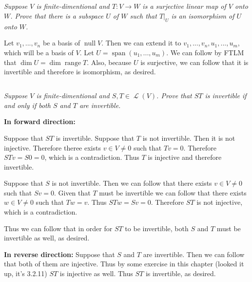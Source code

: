 \documentclass[11pt,oneside,titlepage]{book}
\DeclareMathOperator \map {\mathcal {L}}
\DeclareMathOperator \ns {null}
\DeclareMathOperator \range {range}
\DeclareMathOperator \Span {span}
\begin{document}
\subsection{}

\textit{Suppose $V$ is finite-dimentional and $T: V \to W$ is a surjective linear map
  of $V$ onto $W$. Prove that there is a subspace $U$ of $W$ such that
  $T|_U$ is an isomorphism of $U$ onto $W$. }

Let $v_1, ..., v_n$ be a basis of $\ns V$. Then we can extend it to  $v_1, ..., v_n, u_1, ..., u_m$,
which will be a basis of $V$. Let $U = \Span(u_1, ..., u_m)$. We can follow by FTLM that
$\dim U = \dim \range T$. Also, because $U$ is surjective, we can follow that it is invertible
and therefore is isomorphism, as desired.

\subsection{}

\textit{Suppose $V$ is finite-dimentional and $S, T \in \map(V)$. Prove that $ST$ is invertible
  if and only if both $S$ and $T$ are invertible.}

\textbf{In forward direction: }

Suppose that $ST$ is invertible. Suppose that $T$ is not invertible. Then it is not injective.
Therefore theree exists $v \in V \neq 0$ such that $Tv = 0$. Therefore $STv = S0 = 0$, which
is a contradiction. Thus $T$ is injective and therefore invertible.

Suppose that $S$ is not invertible. Then we can follow that there exists $v \in V \neq 0$ such
that $Sv = 0$. Given that $T$ must be invertible we can follow that there exists $w \in V \neq 0$
such that $Tw = v$. Thus $STw = Sv = 0$. Therefore $ST$ is not injective, which is a contradiction.

Thus we can follow that in order for $ST$ to be invertible, both $S$ and $T$ must be invertible
as well, as desired.

\textbf{In reverse direction: }
Suppose that $S$ and $T$ are invertible. Then we can follow that both of them are injective.
Thus by some exercise 
in this chapter (looked it up, it's 3.2.11) $ST$ is injective as well. Thus $ST$ is invertible, as
desired.


\subsection{}
\end{document}
